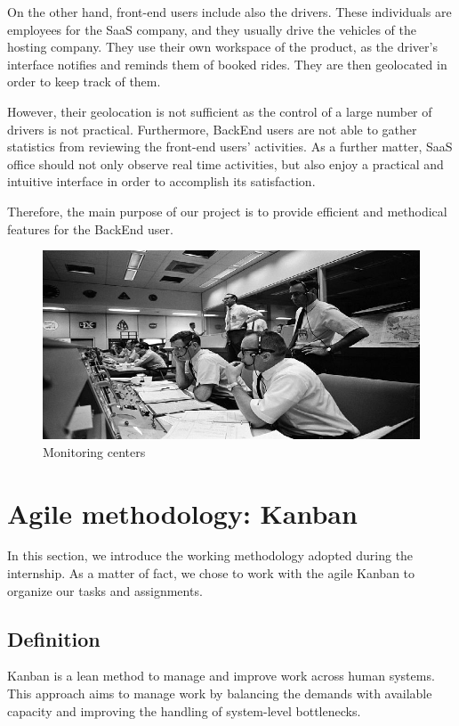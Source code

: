 On the other hand, front-end users include also the drivers. These individuals are employees for the SaaS company, and they usually drive the vehicles of the hosting company. 
They use their own workspace of the product, as the driver's interface notifies and reminds them of booked rides. They are then geolocated in order to keep track of them.

However, their geolocation is not sufficient as the control of a large number of drivers is not practical. Furthermore, BackEnd users are not able to gather statistics from reviewing the front-end users' activities. As a further matter, SaaS office should not only observe real time activities, but also enjoy a practical and intuitive interface in order to accomplish its satisfaction.  

Therefore, the main purpose of our project is to provide efficient and methodical features for the BackEnd user.
\fi
\begin{figure}[!htpb]
\begin{center}
\includegraphics[height=2.0 in]{images/ATHENAsoc.jpg}
\caption{Monitoring centers }
\label{schema}
\end{center}
\end{figure} 
\section{Agile methodology: Kanban}

In this section, we introduce the working methodology adopted during the internship.
As a matter of fact, we chose to work with the agile Kanban to organize our tasks and
assignments.
\subsection{Definition}

Kanban is a lean method to manage and improve work across human systems. This
approach aims to manage work by balancing the demands with available capacity and improving the handling of system-level bottlenecks.

